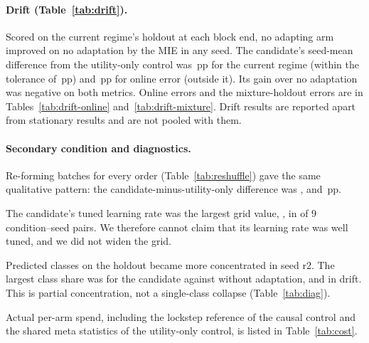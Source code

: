 \paragraph{Drift (Table~\ref{tab:drift}).} Scored on the current regime's holdout at each block end, no
adapting arm improved on no adaptation by the MIE in any seed. The candidate's seed-mean difference from the
utility-only control was \,pp for the current regime (within the tolerance of
\,pp) and \,pp for online error (outside it). Its gain over no
adaptation was negative on both metrics. Online errors and the mixture-holdout errors are in
Tables~\ref{tab:drift-online} and~\ref{tab:drift-mixture}. Drift results are reported apart from stationary
results and are not pooled with them.

\paragraph{Secondary condition and diagnostics.} Re-forming batches for every order
(Table~\ref{tab:reshuffle}) gave the same qualitative pattern: the candidate-minus-utility-only difference
was ,  and
\,pp.

The candidate's tuned learning rate was the largest grid value, , in  of $9$
condition--seed pairs. We therefore cannot claim that its learning rate was well tuned, and we did not widen
the grid.

Predicted classes on the holdout became more concentrated in seed r2. The largest class share was
 for the candidate against  without
adaptation, and  in drift. This is partial concentration, not a
single-class collapse (Table~\ref{tab:diag}).

Actual per-arm spend, including the lockstep reference of the causal control and the shared meta statistics
of the utility-only control, is listed in Table~\ref{tab:cost}.
